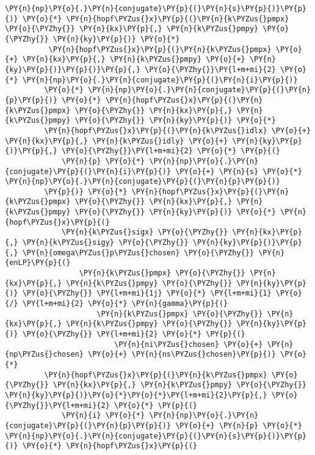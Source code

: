 \begin{Verbatim}[commandchars=\\\{\}]
           \PY{n}{np}\PY{o}{.}\PY{n}{conjugate}\PY{p}{(}\PY{n}{s}\PY{p}{)}\PY{p}{)} \PY{o}{*} \PY{n}{hopf\PYZus{}x}\PY{p}{(}\PY{n}{k\PYZus{}pmpx} \PY{o}{\PYZhy{}} \PY{n}{kx}\PY{p}{,} \PY{n}{k\PYZus{}pmpy} \PY{o}{\PYZhy{}} \PY{n}{ky}\PY{p}{)} \PY{o}{*}
          \PY{n}{hopf\PYZus{}x}\PY{p}{(}\PY{n}{k\PYZus{}pmpx} \PY{o}{+} \PY{n}{kx}\PY{p}{,} \PY{n}{k\PYZus{}pmpy} \PY{o}{+} \PY{n}{ky}\PY{p}{)}\PY{p}{)}\PY{p}{,} \PY{o}{\PYZhy{}}\PY{l+m+mi}{2} \PY{o}{*} \PY{n}{np}\PY{o}{.}\PY{n}{conjugate}\PY{p}{(}\PY{n}{i}\PY{p}{)}
         \PY{o}{*} \PY{n}{np}\PY{o}{.}\PY{n}{conjugate}\PY{p}{(}\PY{n}{p}\PY{p}{)} \PY{o}{*} \PY{n}{hopf\PYZus{}x}\PY{p}{(}\PY{n}{k\PYZus{}pmpx} \PY{o}{\PYZhy{}} \PY{n}{kx}\PY{p}{,} \PY{n}{k\PYZus{}pmpy} \PY{o}{\PYZhy{}} \PY{n}{ky}\PY{p}{)} \PY{o}{*}
         \PY{n}{hopf\PYZus{}x}\PY{p}{(}\PY{n}{k\PYZus{}idlx} \PY{o}{+} \PY{n}{kx}\PY{p}{,} \PY{n}{k\PYZus{}idly} \PY{o}{+} \PY{n}{ky}\PY{p}{)}\PY{p}{,} \PY{o}{\PYZhy{}}\PY{l+m+mi}{2} \PY{o}{*} \PY{p}{(}
             \PY{n}{p} \PY{o}{*} \PY{n}{np}\PY{o}{.}\PY{n}{conjugate}\PY{p}{(}\PY{n}{i}\PY{p}{)} \PY{o}{+} \PY{n}{s} \PY{o}{*} \PY{n}{np}\PY{o}{.}\PY{n}{conjugate}\PY{p}{(}\PY{n}{p}\PY{p}{)}
         \PY{p}{)} \PY{o}{*} \PY{n}{hopf\PYZus{}x}\PY{p}{(}\PY{n}{k\PYZus{}pmpx} \PY{o}{\PYZhy{}} \PY{n}{kx}\PY{p}{,} \PY{n}{k\PYZus{}pmpy} \PY{o}{\PYZhy{}} \PY{n}{ky}\PY{p}{)} \PY{o}{*} \PY{n}{hopf\PYZus{}x}\PY{p}{(}
             \PY{n}{k\PYZus{}sigx} \PY{o}{\PYZhy{}} \PY{n}{kx}\PY{p}{,} \PY{n}{k\PYZus{}sigy} \PY{o}{\PYZhy{}} \PY{n}{ky}\PY{p}{)}\PY{p}{,} \PY{n}{omega\PYZus{}p\PYZus{}chosen} \PY{o}{\PYZhy{}} \PY{n}{enLP}\PY{p}{(}
                 \PY{n}{k\PYZus{}pmpx} \PY{o}{\PYZhy{}} \PY{n}{kx}\PY{p}{,} \PY{n}{k\PYZus{}pmpy} \PY{o}{\PYZhy{}} \PY{n}{ky}\PY{p}{)} \PY{o}{\PYZhy{}} \PY{l+m+mi}{1j} \PY{o}{*} \PY{l+m+mi}{1} \PY{o}{/} \PY{l+m+mi}{2} \PY{o}{*} \PY{n}{gamma}\PY{p}{(}
                     \PY{n}{k\PYZus{}pmpx} \PY{o}{\PYZhy{}} \PY{n}{kx}\PY{p}{,} \PY{n}{k\PYZus{}pmpy} \PY{o}{\PYZhy{}} \PY{n}{ky}\PY{p}{)} \PY{o}{\PYZhy{}} \PY{l+m+mi}{2} \PY{o}{*} \PY{p}{(}
                         \PY{n}{ni\PYZus{}chosen} \PY{o}{+} \PY{n}{np\PYZus{}chosen} \PY{o}{+} \PY{n}{ns\PYZus{}chosen}\PY{p}{)} \PY{o}{*}
         \PY{n}{hopf\PYZus{}x}\PY{p}{(}\PY{n}{k\PYZus{}pmpx} \PY{o}{\PYZhy{}} \PY{n}{kx}\PY{p}{,} \PY{n}{k\PYZus{}pmpy} \PY{o}{\PYZhy{}} \PY{n}{ky}\PY{p}{)}\PY{o}{*}\PY{o}{*}\PY{l+m+mi}{2}\PY{p}{,} \PY{o}{\PYZhy{}}\PY{l+m+mi}{2} \PY{o}{*} \PY{p}{(}
             \PY{n}{i} \PY{o}{*} \PY{n}{np}\PY{o}{.}\PY{n}{conjugate}\PY{p}{(}\PY{n}{p}\PY{p}{)} \PY{o}{+} \PY{n}{p} \PY{o}{*} \PY{n}{np}\PY{o}{.}\PY{n}{conjugate}\PY{p}{(}\PY{n}{s}\PY{p}{)}\PY{p}{)} \PY{o}{*} \PY{n}{hopf\PYZus{}x}\PY{p}{(}

\end{Verbatim}

